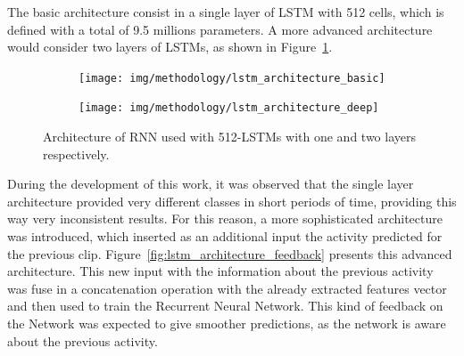The basic architecture consist in a single layer of LSTM with 512 cells, which is defined with a total of 9.5 millions parameters. A more advanced architecture would consider two layers of LSTMs, as shown in  Figure~\ref{fig:lstm_architecture}.%

\begin{figure}[H]
\centering
\begin{subfigure}[b]{.5\textwidth}
  \centering
  \texttt{[image: img/methodology/lstm\_architecture\_basic]}
\end{subfigure}%
\begin{subfigure}[b]{.5\textwidth}
  \centering
  \texttt{[image: img/methodology/lstm\_architecture\_deep]}
\end{subfigure}
\caption{Architecture of RNN used with 512-LSTMs with one and two layers respectively.}
\label{fig:lstm_architecture}
\end{figure}

During the development of this work, it was observed that the single layer architecture provided very different classes in short periods of time, providing this way very inconsistent results. For this reason, a more sophisticated architecture was introduced, which inserted as
an additional input the activity predicted for the previous clip.
Figure~\ref{fig:lstm_architecture_feedback} presents this advanced architecture.
This new input with the information about the previous activity was
fuse in a concatenation operation with the already extracted features vector and then used to train the Recurrent Neural Network. This kind of feedback on the Network was expected to give smoother predictions, as the network is aware about the previous activity.


